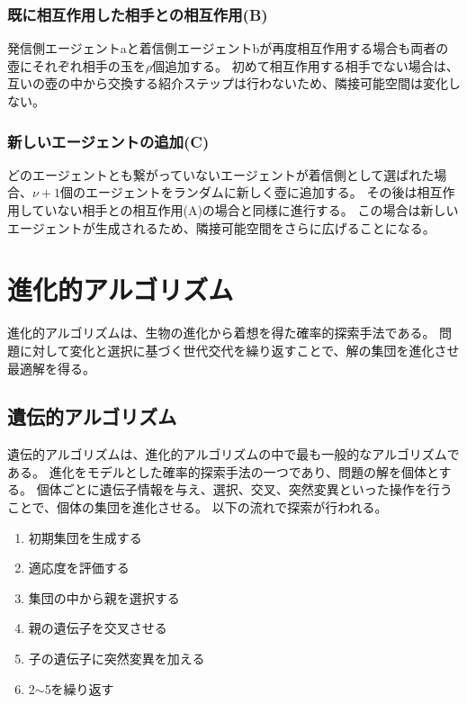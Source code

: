 \documentclass[uplatex,11pt,openany]{ujreport}
\begin{document}
            \subsubsection*{既に相互作用した相手との相互作用(B)}
            発信側エージェントaと着信側エージェントbが再度相互作用する場合も両者の壺にそれぞれ相手の玉を$\rho$個追加する。
            初めて相互作用する相手でない場合は、互いの壺の中から交換する紹介ステップは行わないため、隣接可能空間は変化しない。

            \subsubsection*{新しいエージェントの追加(C)}
            どのエージェントとも繋がっていないエージェントが着信側として選ばれた場合、$\nu+1$個のエージェントをランダムに新しく壺に追加する。
            その後は相互作用していない相手との相互作用(A)の場合と同様に進行する。
            この場合は新しいエージェントが生成されるため、隣接可能空間をさらに広げることになる。







    \section{進化的アルゴリズム}
    進化的アルゴリズムは、生物の進化から着想を得た確率的探索手法である。
    問題に対して変化と選択に基づく世代交代を繰り返すことで、解の集団を進化させ最適解を得る。


        \subsection{遺伝的アルゴリズム}
        遺伝的アルゴリズムは、進化的アルゴリズムの中で最も一般的なアルゴリズムである。
        進化をモデルとした確率的探索手法の一つであり、問題の解を個体とする。
        個体ごとに遺伝子情報を与え、選択、交叉、突然変異といった操作を行うことで、個体の集団を進化させる。
        以下の流れで探索が行われる。
            \begin{enumerate}
                \item 初期集団を生成する
                \item 適応度を評価する
                \item 集団の中から親を選択する
                \item 親の遺伝子を交叉させる
                \item 子の遺伝子に突然変異を加える
                \item 2$\sim$5を繰り返す
            \end{enumerate}
\end{document}
